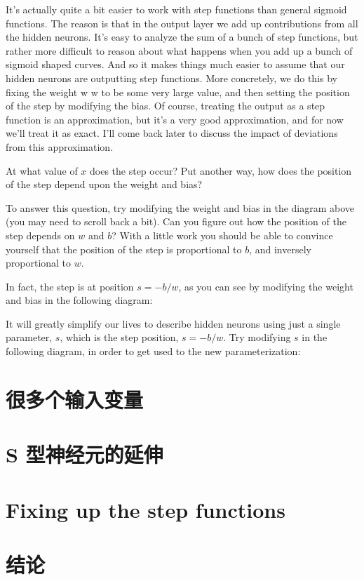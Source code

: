 
It's actually quite a bit easier to work with step functions than general
sigmoid functions. The reason is that in the output layer we add up
contributions from all the hidden neurons. It's easy to analyze the sum of a
bunch of step functions, but rather more difficult to reason about what happens
when you add up a bunch of sigmoid shaped curves. And so it makes things much
easier to assume that our hidden neurons are outputting step functions. More
concretely, we do this by fixing the weight w w to be some very large value, and
then setting the position of the step by modifying the bias. Of course, treating
the output as a step function is an approximation, but it's a very good
approximation, and for now we'll treat it as exact. I'll come back later to
discuss the impact of deviations from this approximation.

At what value of $x$ does the step occur? Put another way, how does the position
of the step depend upon the weight and bias?

To answer this question, try modifying the weight and bias in the diagram above
(you may need to scroll back a bit). Can you figure out how the position of the
step depends on $w$ and $b$? With a little work you should be able to convince
yourself that the position of the step is proportional to $b$, and inversely
proportional to $w$.

In fact, the step is at position $s = -b/w$, as you can see by modifying the
weight and bias in the following diagram:


It will greatly simplify our lives to describe hidden neurons using just a
single parameter, $s$, which is the step position, $s = -b/w$. Try modifying $s$
in the following diagram, in order to get used to the new parameterization:


\section{很多个输入变量}
\label{sec:many_input_variables}

\section{S 型神经元的延伸}
\label{sec:extension_beyond_sigmoid_neurons}

\section{Fixing up the step functions}
\label{sec:fixing_up_the_step_functions}

\section{结论}
\label{sec:conclusion}
